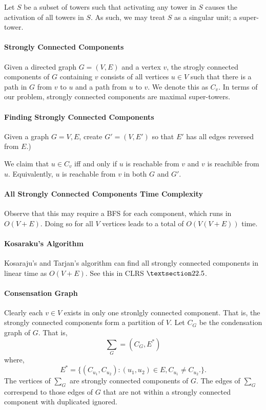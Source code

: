 Let \(S\) be a subset of towers such that activating any tower in \(S\)
causes the activation of all towers in \(S\). As such, we may treat \(S\) 
as a singular unit; a super-tower.

\paragraph{Strongly Connected Components}
Given a directed graph \(G = (V, E)\) and a vertex \(v\), the strogly connected
components of \(G\) containing \(v\) consists of all vertices
\(u \in  V\) such that there is a path in \(G\) from \(v\) to \(u\) and a path
from \(u\) to \(v\). We denote this as \(C_v\).
In terms of our problem, strongly connected components are maximal
super-towers.

\paragraph{Finding Strongly Connected Components}
Given a graph \(G = V, E\), create \(G' = (V, E')\) so that
\(E'\) has all edges reversed from \(E\).)

We claim that \(u \in C_v\) iff and only if \(u\) is reachable from \(v\)
and \(v\) is reachible from \(u\). Equivalently, \(u\) is reachable from
\(v\) in both \(G\) and \(G'\).

\paragraph{All Strongly Connected Components Time Complexity}
Observe that this may require a BFS for each component, which runs in
\(O(V + E)\). Doing so for all \(V\) vertices leads to a total of
 \(O(V(V+E))\) time.

\paragraph{Kosaraku's Algorithm}
Kosaraju's and Tarjan's algorithm can find all strongly connected components
in linear time as \(O(V+E)\). See this in CLRS \(\textsection 22.5\).

\paragraph{Consensation Graph}
Clearly each \(v \in  V\) exists in only one stronlgly connected component.
That is, the strongly connected components form a partition of \(V\).
Let \(C_G\) be the condensation graph of \(G\). That is, \[
    \sum_G = (C_G, E^*)
\] where,
\[
    E^* = \{
        (C_{u_1}, C_{u_2}) : (u_1, u_2) \in  E, C_{u_1} \neq C_{u_2}.
    \} 
.\]
The vertices of \(\sum_G\) are strongly connected components of \(G\).
The edges of \(\sum_G\) correspend to those edges of \(G\) that are not within
a strongly connected component with duplicated ignored.

